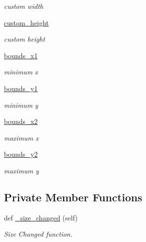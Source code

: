 \begin{DoxyCompactItemize}
\begin{DoxyCompactList}\small\item\em custom width \end{DoxyCompactList}\item 
\hyperlink{classvisualizer_1_1svgitem_1_1SvgItem_a333ecccefa1eb44ec43998fd24f8efe0}{custom\+\_\+height}
\begin{DoxyCompactList}\small\item\em custom height \end{DoxyCompactList}\item 
\hyperlink{classvisualizer_1_1svgitem_1_1SvgItem_aad26c81fd84200b922866a9ad3119165}{bounds\+\_\+x1}
\begin{DoxyCompactList}\small\item\em minimum x \end{DoxyCompactList}\item 
\hyperlink{classvisualizer_1_1svgitem_1_1SvgItem_aa0f146c39e7b9642ece6945bd2a88112}{bounds\+\_\+y1}
\begin{DoxyCompactList}\small\item\em minimum y \end{DoxyCompactList}\item 
\hyperlink{classvisualizer_1_1svgitem_1_1SvgItem_a5c89f17fecfe68834e627463abb75634}{bounds\+\_\+x2}
\begin{DoxyCompactList}\small\item\em maximum x \end{DoxyCompactList}\item 
\hyperlink{classvisualizer_1_1svgitem_1_1SvgItem_a459361f3b79926d5a9136110ee7bec73}{bounds\+\_\+y2}
\begin{DoxyCompactList}\small\item\em maximum y \end{DoxyCompactList}\end{DoxyCompactItemize}
\subsection*{Private Member Functions}
\begin{DoxyCompactItemize}
\item 
def \hyperlink{classvisualizer_1_1svgitem_1_1SvgItem_a565dbade860935217740bfa89230d201}{\+\_\+size\+\_\+changed} (self)
\begin{DoxyCompactList}\small\item\em Size Changed function. \end{DoxyCompactList}\end{DoxyCompactItemize}
